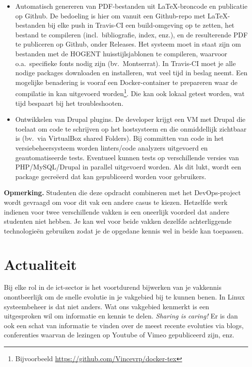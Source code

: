 \begin{itemize}
  \item Automatisch genereren van PDF-bestanden uit \LaTeX{}-broncode en publicatie op Github. De bedoeling is hier om vanuit een Github-repo met \LaTeX-{}be\-stan\-den bij elke push in Travis-CI een build-omgeving op te zetten, het bestand te compileren (incl.\ bibliografie, index, enz.), en de resulterende PDF te publiceren op Github, onder Releases. Het systeem moet in staat zijn om bestanden met de HOGENT huisstijlsjablonen te compileren, waarvoor o.a.\ specifieke fonts nodig zijn (bv.\ Montserrat). In Travis-CI moet je alle nodige packages downloaden en installeren, wat veel tijd in beslag neemt. Een mogelijke benadering is vooraf een Docker-container te prepareren waar de compilatie in kan uitgevoerd worden\footnote{Bijvoorbeeld \url{https://github.com/Vincevrp/docker-tex}}. Die kan ook lokaal getest worden, wat tijd bespaart bij het troubleshooten.

  \item Ontwikkelen van Drupal plugins. De developer krijgt een VM met Drupal die toelaat om code te schrijven op het hostsysteem en die onmiddellijk zichtbaar is (bv.\ via VirtualBox shared Folders). Bij committen van code in het versiebeheersysteem worden linters/code analyzers uitgevoerd en geautomatiseerde tests. Eventueel kunnen tests op verschillende versies van PHP/MySQL/Drupal in parallel uitgevoerd worden. Als dit lukt, wordt een package gecreëerd dat kan gepubliceerd worden voor gebruikers.
\end{itemize}

\textbf{Opmerking.} Studenten die deze opdracht combineren met het DevOps-project wordt gevraagd om voor dit vak een andere casus te kiezen. Hetzelfde werk indienen voor twee verschillende vakken is een oneerlijk voordeel dat andere studenten niet hebben. Je kan wel voor beide vakken dezelfde achterliggende technologieën gebruiken zodat je de opgedane kennis wel in beide kan toepassen.

\section{Actualiteit}%
\label{sec:actualiteit}

Bij elke rol in de ict-sector is het voortdurend bijwerken van je vakkennis onontbeerlijk om de snelle evolutie in je vakgebied bij te kunnen benen. In Linux systeembeheer is dat niet anders. Wat ons vakgebied kenmerkt is een uitgesproken wil om informatie en kennis te delen. \emph{Sharing is caring!} Er is dan ook een schat van informatie te vinden over de meest recente evoluties via blogs, conferenties waarvan de lezingen op Youtube of Vimeo gepubliceerd zijn, enz.

